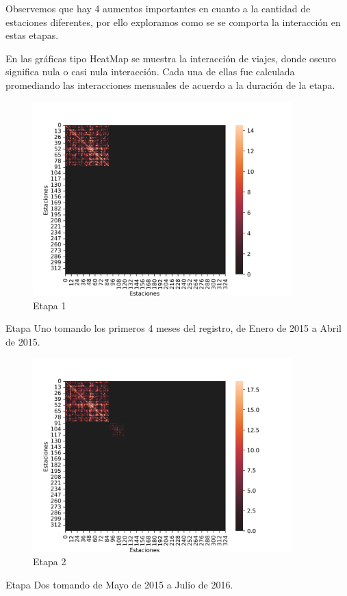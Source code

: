 \documentclass[
]{article}
\begin{document}
Observemos que hay 4 aumentos importantes en cuanto a la cantidad de
estaciones diferentes, por ello exploramos como se se comporta la
interacción en estas etapas.

En las gráficas tipo HeatMap se muestra la interacción de viajes, donde
oscuro significa nula o casi nula interacción. Cada una de ellas fue
calculada promediando las interacciones mensuales de acuerdo a la
duración de la etapa.

\begin{figure}
\centering
\includegraphics[width=10cm]{../plots/resultsUno.png}
\caption{Etapa 1}
\end{figure}

\newpage
Etapa Uno tomando los primeros 4 meses del registro, de Enero de 2015 a
Abril de 2015.

\newpage
\begin{figure}[h]
\centering
\includegraphics[width=10cm]{../plots/resultsDos.png}
\caption{Etapa 2}
\end{figure}

Etapa Dos tomando de Mayo de 2015 a Julio de 2016.
\end{document}
